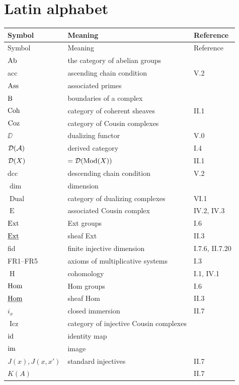 \section*{Latin alphabet}
\begin{longtable}{@{}l p{8cm} l@{}}
	\toprule
	Symbol & Meaning & Reference \\
	\midrule
	\endfirsthead
	\midrule
	Symbol & Meaning & Reference \\
	\midrule
	\endhead
	\bottomrule
	\endfoot
	$\operatorname{Ab}$ & the category of abelian groups & \\
	acc & ascending chain condition & V.2 \\
	$\operatorname{Ass}$ & associated primes & \\
	$\operatorname{B}$ & boundaries of a complex & \\
	$\operatorname{Coh}$ & category of coherent sheaves & II.1 \\
	$\operatorname{Coz}$ & category of Cousin complexes & \\
	$\DD$ & dualizing functor & V.0 \\
	$\mathcal{D}(\mathcal{A})$ & derived category & I.4 \\
	$\mathcal{D}(X)$ & $= \mathcal{D}(\operatorname{Mod}(X))$ & II.1 \\
	dcc & descending chain condition & V.2 \\
	$\dim$ & dimension & \\
	$\operatorname{Dual}$ & category of dualizing complexes & VI.1 \\
	$\operatorname{E}$ & associated Cousin complex & IV.2, IV.3 \\
	$\operatorname{Ext}$ & Ext groups & I.6 \\
	$\underline{\operatorname{Ext}}$ & sheaf Ext & II.3 \\
	fid & finite injective dimension & I.7.6, II.7.20 \\
	FR1--FR5 & axioms of multiplicative systems & I.3 \\
	$\operatorname{H}$ & cohomology & I.1, IV.1 \\
	$\operatorname{Hom}$ & Hom groups & I.6 \\
	$\underline{\operatorname{Hom}}$ & sheaf Hom & II.3 \\
	$i_x$ & closed immersion & II.7 \\
	$\operatorname{Icz}$ & category of injective Cousin complexes & \\
	$\operatorname{id}$ & identity map & \\
	$\operatorname{im}$ & image & \\
	$J(x),J(x,x')$ & standard injectives & II.7 \\
	$K(A)$ &  & II.7 \\

\end{longtable}
